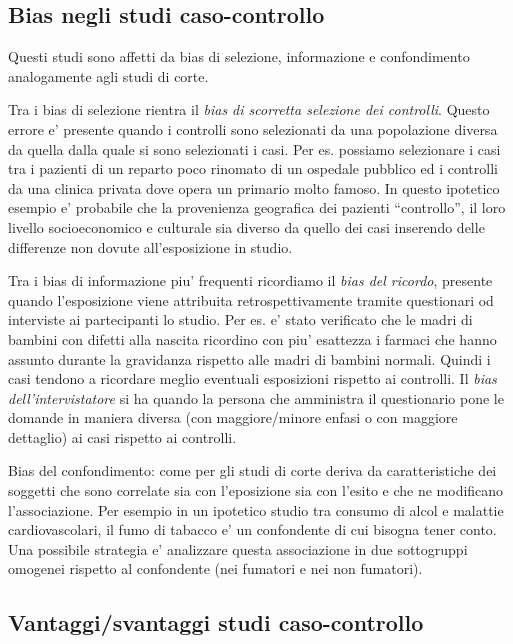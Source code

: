 \documentclass[]{book}
\begin{document}
\hypertarget{bias-negli-studi-caso-controllo}{%
\subsection{Bias negli studi caso-controllo}\label{bias-negli-studi-caso-controllo}}

Questi studi sono affetti da bias di selezione, informazione e confondimento analogamente agli studi di corte.

Tra i bias di selezione rientra il \emph{bias di scorretta selezione dei controlli}. Questo errore e' presente quando i controlli sono selezionati da una popolazione diversa da quella dalla quale si sono selezionati i casi. Per es. possiamo selezionare i casi tra i pazienti di un reparto poco rinomato di un ospedale pubblico ed i controlli da una clinica privata dove opera un primario molto famoso. In questo ipotetico esempio e' probabile che la provenienza geografica dei pazienti ``controllo'', il loro livello socioeconomico e culturale sia diverso da quello dei casi inserendo delle differenze non dovute all'esposizione in studio.

Tra i bias di informazione piu' frequenti ricordiamo il \emph{bias del ricordo}, presente quando l'esposizione viene attribuita retrospettivamente tramite questionari od interviste ai partecipanti lo studio. Per es. e' stato verificato che le madri di bambini con difetti alla nascita ricordino con piu' esattezza i farmaci che hanno assunto durante la gravidanza rispetto alle madri di bambini normali. Quindi i casi tendono a ricordare meglio eventuali esposizioni rispetto ai controlli. Il \emph{bias dell'intervistatore} si ha quando la persona che amministra il questionario pone le domande in maniera diversa (con maggiore/minore enfasi o con maggiore dettaglio) ai casi rispetto ai controlli.

Bias del confondimento: come per gli studi di corte deriva da caratteristiche dei soggetti che sono correlate sia con l'eposizione sia con l'esito e che ne modificano l'associazione. Per esempio in un ipotetico studio tra consumo di alcol e malattie cardiovascolari, il fumo di tabacco e' un confondente di cui bisogna tener conto. Una possibile strategia e' analizzare questa associazione in due sottogruppi omogenei rispetto al confondente (nei fumatori e nei non fumatori).

\hypertarget{vantaggisvantaggi-studi-caso-controllo}{%
\subsection{Vantaggi/svantaggi studi caso-controllo}\label{vantaggisvantaggi-studi-caso-controllo}}
\end{document}
